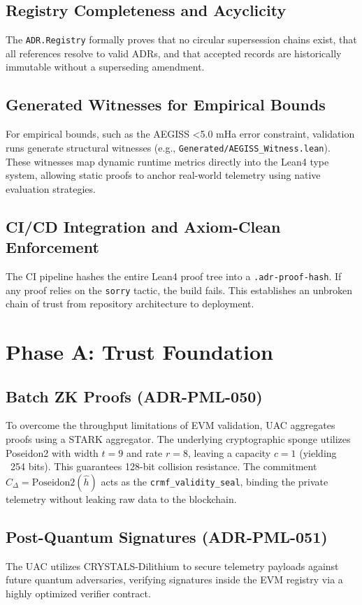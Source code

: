 \documentclass[11pt,a4paper]{article}
\begin{document}
\subsection{Registry Completeness and Acyclicity}
The \texttt{ADR.Registry} formally proves that no circular supersession chains exist, that all references resolve to valid ADRs, and that accepted records are historically immutable without a superseding amendment.

\subsection{Generated Witnesses for Empirical Bounds}
For empirical bounds, such as the AEGISS <5.0 mHa error constraint, validation runs generate structural witnesses (e.g., \texttt{Generated/AEGISS\_Witness.lean}). These witnesses map dynamic runtime metrics directly into the Lean4 type system, allowing static proofs to anchor real-world telemetry using native evaluation strategies.

\subsection{CI/CD Integration and Axiom-Clean Enforcement}
The CI pipeline hashes the entire Lean4 proof tree into a \texttt{.adr-proof-hash}. If any proof relies on the \texttt{sorry} tactic, the build fails. This establishes an unbroken chain of trust from repository architecture to deployment.

\section{Phase A: Trust Foundation}
\subsection{Batch ZK Proofs (ADR-PML-050)}
To overcome the throughput limitations of EVM validation, UAC aggregates proofs using a STARK aggregator. The underlying cryptographic sponge utilizes Poseidon2 with width $t=9$ and rate $r=8$, leaving a capacity $c=1$ (yielding ~254 bits). This guarantees 128-bit collision resistance. The commitment $C_\Delta = \text{Poseidon2}(\hat{h})$ acts as the \texttt{crmf\_validity\_seal}, binding the private telemetry without leaking raw data to the blockchain.

\subsection{Post-Quantum Signatures (ADR-PML-051)}
The UAC utilizes CRYSTALS-Dilithium to secure telemetry payloads against future quantum adversaries, verifying signatures inside the EVM registry via a highly optimized verifier contract.
\end{document}
